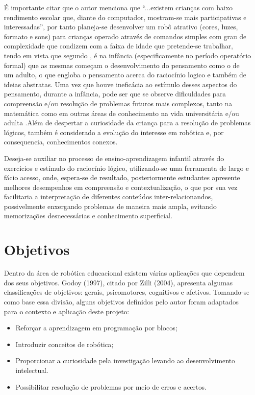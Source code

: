 É importante citar que o autor  menciona que “...existem crianças com baixo rendimento escolar
que, diante do computador, mostram-se mais participativas e interessadas”, por tanto planeja-se desenvolver um robô
atrativo (cores, luzes, formato e sons) para crianças operado através de comandos simples com grau de complexidade
que condizem com a faixa de idade que pretende-se trabalhar, tendo em vista que segundo ,
é na infância (especificamente no período operatório formal) que as mesmas começam o desenvolvimento do pensamento
como o de um adulto, o que engloba o pensamento acerca do raciocínio logico e também de ideias abstratas. Uma vez
que houve ineficácia ao estímulo desses aspectos do pensamento, durante a infância, pode ser que se observe
dificuldades para compreensão e/ou resolução de problemas futuros mais complexos, tanto na matemática como em
outras áreas de conhecimento na vida universitária e/ou adulta \cite{rauber:2003}.Além de despertar a curiosidade
da criança para a resolução de problemas lógicos, também é considerado a evolução do interesse em robôtica e, por
consequencia, conhecimentos conexos.

Deseja-se auxiliar no processo de ensino-aprendizagem infantil através do exercícios e estímulo do raciocínio lógico,
utilizando-se uma ferramenta de largo e fácio acesso, onde, espera-se de resultado, posteriormente estudantes 
apresente melhores desempenhos em compreensão e contextualização, o que por sua vez facilitaria a interpretação 
de diferentes conteúdos inter-relacionandos, possivelmente enxergando problemas de maneira mais ampla, evitando 
memorizações desnecessárias e conhecimento superficial.

\section{Objetivos}
Dentro da área de robótica educacional existem várias aplicações que dependem dos seus objetivos. Godoy (1997), citado por Zilli (2004), apresenta algumas classificações de objetivos: gerais, psicomotores, cognitivos e afetivos. Tomando-se como base essa divisão, alguns objetivos definidos pelo autor foram adaptados para o contexto e aplicação deste projeto:
\begin{itemize}
	\item Reforçar a aprendizagem em programação por blocos;
	\item Introduzir conceitos de robótica;
	\item Proporcionar a curiosidade pela investigação levando ao desenvolvimento intelectual.
	\item Possibilitar resolução de problemas por meio de erros e acertos.
\end{itemize}

